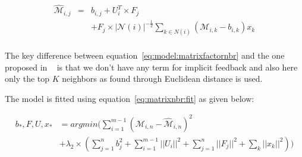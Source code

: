 \begin{equation}
  \label{eq:model:matrixfactornbr}
  \begin{array}{lcl}
    \widehat{\mathcal{M}}_{i,j} & = &  b_{i,j} + U_i^T\times F_j \\
                                &   & + F_j \times |\mathcal{N}(i)|^{-\frac{1}{2}}\sum_{k \in N(i)} (\mathcal{M}_{i,k} - b_{i,k}) x_k \\
  \end{array}
\end{equation}

The key difference between equation~\ref{eq:model:matrixfactornbr} and the one proposed in 
~\cite{koren2008factor} is that we don't have any term for implicit feedback and also here 
only the top $K$ neighbors as found through Euclidean distance is used. 

The model is fitted using equation~\ref{eq:matrixnbr:fit} as given below:

\begin{equation}
  \label{eq:matrixnbr:fit}
  \begin{array}{ll}
    b_*, F, U, x_*  & = argmin (\sum \limits_{i=1}^{m-1} \left(\mathcal{M}_{i,n} - \widehat{\mathcal{M}}_{i,n}   \right)^2 \\
    &  + \lambda_2\times(\sum \limits_{j=1}^{n}b_j^2 + \sum \limits_{i=1}^{m-1} || U_i||^2 + \sum \limits_{j=1}^{n} || F_j||^2 + \sum_k ||x_k||^2))
  \end{array}
  \end{equation}

